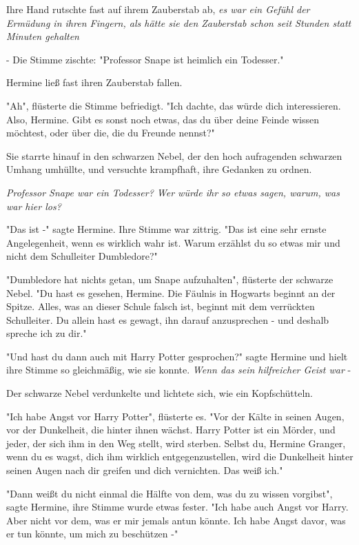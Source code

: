 {Ihre Hand rutschte fast auf ihrem Zauberstab ab, \emph{es war ein Gefühl der Ermüdung in ihren Fingern, als hätte sie den Zauberstab schon seit Stunden statt Minuten gehalten}

- Die Stimme zischte: "Professor Snape ist heimlich ein Todesser."

Hermine ließ fast ihren Zauberstab fallen.

"Ah", flüsterte die Stimme befriedigt. "Ich dachte, das würde dich interessieren. Also, Hermine. Gibt es sonst noch etwas, das du über deine Feinde wissen möchtest, oder über die, die du Freunde nennst?"

Sie starrte hinauf in den schwarzen Nebel, der den hoch aufragenden schwarzen Umhang umhüllte, und versuchte krampfhaft, ihre Gedanken zu ordnen.

\emph{Professor Snape war ein Todesser? Wer würde ihr so etwas sagen, warum, was war hier los?}

"Das ist -" sagte Hermine. Ihre Stimme war zittrig. "Das ist eine sehr ernste Angelegenheit, wenn es wirklich wahr ist. Warum erzählst du so etwas mir und nicht dem Schulleiter Dumbledore?"

"Dumbledore hat nichts getan, um Snape aufzuhalten", flüsterte der schwarze Nebel. "Du hast es gesehen, Hermine. Die Fäulnis in Hogwarts beginnt an der Spitze. Alles, was an dieser Schule falsch ist, beginnt mit dem verrückten Schulleiter. Du allein hast es gewagt, ihn darauf anzusprechen - und deshalb spreche ich zu dir."

"Und hast du dann auch mit Harry Potter gesprochen?" sagte Hermine und hielt ihre Stimme so gleichmäßig, wie sie konnte. \emph{Wenn das sein hilfreicher Geist war} -

Der schwarze Nebel verdunkelte und lichtete sich, wie ein Kopfschütteln.

"Ich habe Angst vor Harry Potter", flüsterte es. "Vor der Kälte in seinen Augen, vor der Dunkelheit, die hinter ihnen wächst. Harry Potter ist ein Mörder, und jeder, der sich ihm in den Weg stellt, wird sterben. Selbst du, Hermine Granger, wenn du es wagst, dich ihm wirklich entgegenzustellen, wird die Dunkelheit hinter seinen Augen nach dir greifen und dich vernichten. Das weiß ich."

"Dann weißt du nicht einmal die Hälfte von dem, was du zu wissen vorgibst", sagte Hermine, ihre Stimme wurde etwas fester. "Ich habe auch Angst vor Harry. Aber nicht vor dem, was er mir jemals antun könnte. Ich habe Angst davor, was er tun könnte, um mich zu beschützen -"

}
